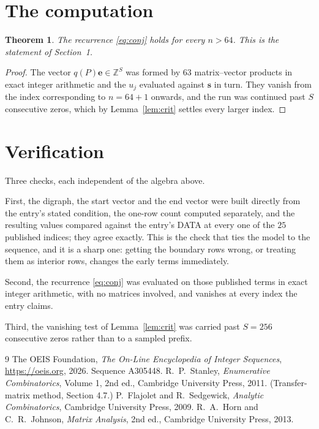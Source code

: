 \documentclass[11pt,a4paper]{article}
\theoremstyle{plain}
\newtheorem{theorem}{Theorem}
\theoremstyle{definition}
\begin{document}
\section{The computation}

\begin{theorem}
The recurrence \eqref{eq:conj} holds for every $n>64$. This is the statement of
Section~1.
\end{theorem}

\begin{proof}
The vector $q(P)\mathbf{e}\in\mathbb{Z}^{S}$ was formed by $63$ matrix--vector
products in exact integer arithmetic and the $u_j$ evaluated against $\mathbf{s}$ in turn.
They vanish from the index corresponding to $n=64+1$ onwards, and the run was continued
past $S$ consecutive zeros, which by Lemma~\ref{lem:crit} settles every larger index.
\end{proof}

\section{Verification}

Three checks, each independent of the algebra above.

First, the digraph, the start vector and the end vector were built directly from the
entry's stated condition, the one-row count computed separately, and the resulting values
compared against the entry's DATA at every one of the $25$ published indices; they
agree exactly. This is the check that ties the model to the sequence, and it is a sharp one:
getting the boundary rows wrong, or treating them as interior rows, changes the early terms
immediately.

Second, the recurrence \eqref{eq:conj} was evaluated on those published terms in exact
integer arithmetic, with no matrices involved, and vanishes at every index the entry claims.

Third, the vanishing test of Lemma~\ref{lem:crit} was carried past $S=256$ consecutive
zeros rather than to a sampled prefix.

\begin{thebibliography}{9}
 The OEIS Foundation, \emph{The On-Line Encyclopedia of Integer
Sequences}, \url{https://oeis.org}, 2026. Sequence A305448.
 R.~P.~Stanley, \emph{Enumerative Combinatorics}, Volume 1, 2nd ed.,
Cambridge University Press, 2011. (Transfer-matrix method, Section 4.7.)
 P.~Flajolet and R.~Sedgewick, \emph{Analytic Combinatorics}, Cambridge
University Press, 2009.
 R.~A.~Horn and C.~R.~Johnson, \emph{Matrix Analysis}, 2nd ed., Cambridge
University Press, 2013.
\end{thebibliography}
\end{document}
